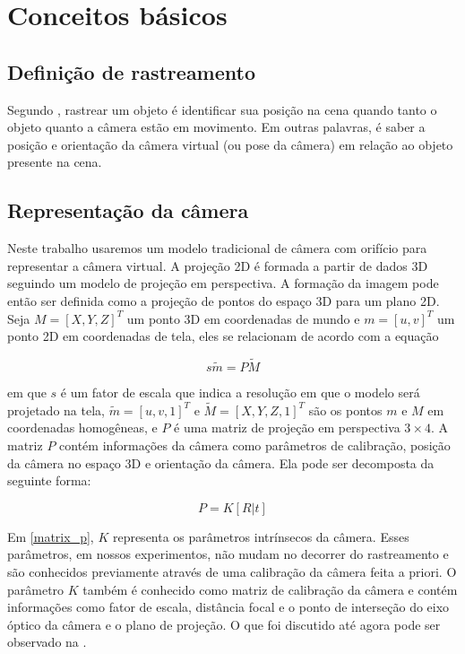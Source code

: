 \chapter{Conceitos básicos}

\section{Definição de rastreamento}

Segundo \cite{lepetit}, rastrear um objeto é identificar sua posição na cena quando tanto o objeto quanto a câmera estão em movimento. Em outras palavras, é saber a posição e orientação da câmera virtual (ou pose da câmera) em relação ao objeto presente na cena.

\section{Representação da câmera}

Neste trabalho usaremos um modelo tradicional de câmera com orifício para representar a câmera virtual. A projeção 2D é formada a partir de dados 3D seguindo um modelo de projeção em perspectiva. A formação da imagem pode então ser definida como a projeção de pontos do espaço 3D para um plano 2D. Seja $M = [X, Y, Z]^T$ um ponto 3D em coordenadas de mundo e $m = [u, v]^T$ um ponto 2D em coordenadas de tela, eles se relacionam de acordo com a equação

\begin{equation}
\label{projection_eq}
s\tilde{m} = P\tilde{M}
\end{equation}

em que $s$ é um fator de escala que indica a resolução em que o modelo será projetado na tela, $\tilde{m} = [u, v, 1]^T$ e $\tilde{M} = [X, Y, Z, 1]^T$ são os pontos $m$ e $M$ em coordenadas homogêneas, e $P$ é uma matriz de projeção em perspectiva $3 \times 4$. A matriz $P$ contém informações da câmera como parâmetros de calibração, posição da câmera no espaço 3D e orientação da câmera. Ela pode ser decomposta da seguinte forma:

\begin{equation}
\label{matrix_p}
P = K[R | t]
\end{equation}

Em \eqref{matrix_p}, $K$ representa os parâmetros intrínsecos da câmera. Esses parâmetros, em nossos experimentos, não mudam no decorrer do rastreamento e são conhecidos previamente através de uma calibração da câmera feita a priori. O parâmetro $K$ também é conhecido como matriz de calibração da câmera \cite{lepetit} e contém informações como fator de escala, distância focal e o ponto de interseção do eixo óptico da câmera e o plano de projeção. O que foi discutido até agora pode ser observado na .

